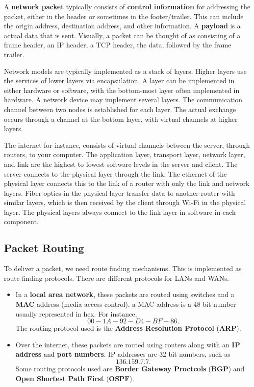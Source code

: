 \documentclass[11pt]{article}
\theoremstyle{plain} %
\theoremstyle{definition}
\theoremstyle{example}
\theoremstyle{remark}
\begin{document}
A \textbf{network packet} typically consists of \textbf{control information} for addressing the packet, either in the header or sometimes in the footer/trailer. This can include the origin address, destination address, and other information. 
A \textbf{payload} is a actual data that is sent. Visually, a packet can be thought of as consisting of a frame header, an IP header, a TCP header, the data, followed by the frame trailer. 

Network models are typically implemented as a stack of layers. Higher layers use the services of lower layers via encapsulation. A layer can be implemented in either hardware or software, with the bottom-most layer often implemented in hardware. A network device may implement several layers. The communication channel between two nodes is established for each layer. The actual exchange occurs through a channel at the bottom layer, with virtual channels at higher layers. 

The internet for instance, consists of virtual channels between the server, through routers, to your computer. The application layer, transport layer, network layer, and link are the highest to lowest software levels in the server and client. The server connects to the physical layer through the link. The ethernet of the physical layer connects this to the link of a router with only the link and network layers. Fiber optics in the physical layer transfer data to another router with similar layers, which is then received by the client through Wi-Fi in the physical layer. The physical layers always connect to the link layer in software in each component.  

\subsection{Packet Routing}
To deliver a packet, we need route finding mechanisms. This is implemented as route finding protocols. There are different protocols for LANs and WANs. 
\begin{itemize}
	\item In a \textbf{local area network}, these packets are routed using switches and a \textbf{MAC} address (media access control). a MAC address is a 48 bit number usually represented in hex. For instance, $$00-1A-92-D4-BF-86.$$ The routing protocol used is the \textbf{Address Resolution Protocol} (\textbf{ARP}). 
	\item Over the internet, these packets are routed using routers along with an \textbf{IP address} and \textbf{port numbers}. IP addresses are 32 bit numbers, such as 
	$$136.159.7.7.$$
	Some routing protocols used are \textbf{Border Gateway Proctcols} (\textbf{BGP}) and \textbf{Open Shortest Path First} (\textbf{OSPF}). 
\end{itemize}
\end{document}
